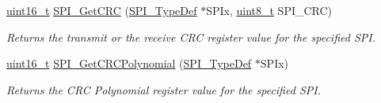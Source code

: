 \begin{DoxyCompactItemize}
\hyperlink{stdint_8h_a273cf69d639a59973b6019625df33e30}{uint16\-\_\-t} \hyperlink{group___s_p_i___group3_ga4c81c193516e82cf0a2fdc149ef20cc6}{S\-P\-I\-\_\-\-Get\-C\-R\-C} (\hyperlink{struct_s_p_i___type_def}{S\-P\-I\-\_\-\-Type\-Def} $\ast$S\-P\-Ix, \hyperlink{stdint_8h_aba7bc1797add20fe3efdf37ced1182c5}{uint8\-\_\-t} S\-P\-I\-\_\-\-C\-R\-C)
\begin{DoxyCompactList}\small\item\em Returns the transmit or the receive C\-R\-C register value for the specified S\-P\-I. \end{DoxyCompactList}\item 
\hyperlink{stdint_8h_a273cf69d639a59973b6019625df33e30}{uint16\-\_\-t} \hyperlink{group___s_p_i___group3_ga80fb9374cfce670f29128bb78568353f}{S\-P\-I\-\_\-\-Get\-C\-R\-C\-Polynomial} (\hyperlink{struct_s_p_i___type_def}{S\-P\-I\-\_\-\-Type\-Def} $\ast$S\-P\-Ix)
\begin{DoxyCompactList}\small\item\em Returns the C\-R\-C Polynomial register value for the specified S\-P\-I. \end{DoxyCompactList}\end{DoxyCompactItemize}


